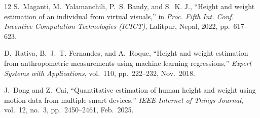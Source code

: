 \documentclass[conference]{IEEEtran}
\begin{document}
\begin{thebibliography}{12}
S.~Maganti, M.~Yalamanchili, P.~S. Bandy, and S.~K. J., ``Height and weight estimation of an individual from virtual visuals,'' in \textit{Proc. Fifth Int. Conf. Inventive Computation Technologies (ICICT)}, Lalitpur, Nepal, 2022, pp.~617--623.

D.~Rativa, B.~J.~T. Fernandes, and A.~Roque, ``Height and weight estimation from anthropometric measurements using machine learning regressions,'' \textit{Expert Systems with Applications}, vol.~110, pp.~222--232, Nov.~2018.

J.~Dong and Z.~Cai, ``Quantitative estimation of human height and weight using motion data from multiple smart devices,'' \textit{IEEE Internet of Things Journal}, vol.~12, no.~3, pp.~2450--2461, Feb.~2025.

\end{thebibliography}
\end{document}
